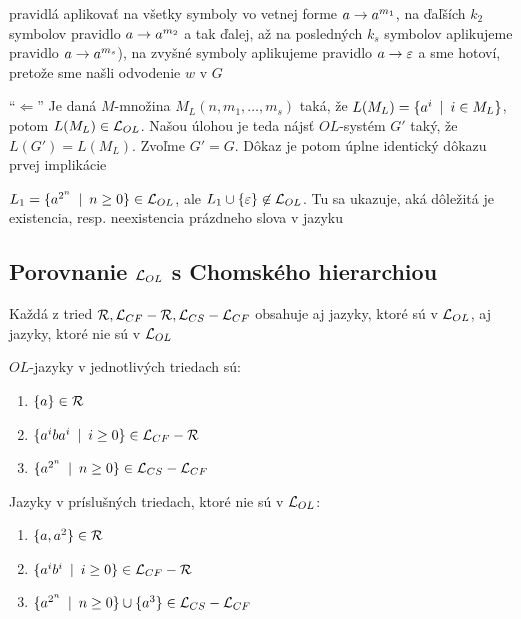 \begin{dokaz}
\begin{description}
\begin{description}
{          pravidlá aplikovať na všetky symboly vo vetnej forme} $a\rightarrow
          a^{m_{1}}$, na ďaľších $k_{2}$ symbolov pravidlo $a\rightarrow a^{m_{2}}$
          a tak ďalej, až na posledných $k_{s}$ symbolov aplikujeme pravidlo
          $a\rightarrow a^{m_{s}}$), na zvyšné symboly aplikujeme pravidlo
          $a\rightarrow\varepsilon$ a sme hotoví, pretože sme našli odvodenie $w$ v
          $G$
      \end{description}
    \item{``$\Leftarrow$''} Je daná $M$-množina
      $M_{L}(n,m_{1},\dots,m_{s})$ taká, že $L(M_{L})=\{a^{i}\enspace |\enspace i\in
      M_{L}\}$, potom $L(M_{L})\in\mathcal{L}_{OL}$. Našou úlohou je
      teda nájsť $OL$-systém $G'$ taký, že $L(G')=L(M_{L})$. Zvoľme
      $G'=G$. Dôkaz je potom úplne identický dôkazu prvej implikácie
  \end{description}
\end{dokaz}

\begin{poznamka}
  $L_{1}=\{a^{2^{n}}\enspace |\enspace n\geq0\}\in\mathcal{L}_{OL}$, ale
  $L_{1}\cup\{\varepsilon\}\not\in\mathcal{L}_{OL}$. Tu sa ukazuje,
  aká dôležitá je existencia, resp. neexistencia prázdneho slova v
  jazyku
\end{poznamka}

\subsection{Porovnanie $\mathcal{L}_{OL}$ s Chomského hierarchiou}

\begin{veta}
  Každá z tried $\mathcal{R},\mathcal{L}_{CF} - \mathcal{R},
  \mathcal{L}_{CS} - \mathcal{L}_{CF}$ obsahuje aj jazyky, ktoré sú
  v $\mathcal{L}_{OL}$, aj jazyky, ktoré nie sú v $\mathcal{L}_{OL}$
\end{veta}

\begin{dokaz}
  $OL$-jazyky v jednotlivých triedach sú:

  \begin{enumerate}
    \item $\{a\}\in\mathcal{R}$
    \item $\{a^{i}ba^{i}\enspace |\enspace i\geq0\}\in\mathcal{L}_{CF} - \mathcal{R}$
    \item $\{a^{2^{n}}\enspace |\enspace n\geq0\}\in\mathcal{L}_{CS} - \mathcal{L}_{CF}$
  \end{enumerate}

  Jazyky v príslušných triedach, ktoré nie sú v $\mathcal{L}_{OL}$:

  \begin{enumerate}
    \item $\{a,a^{2}\}\in\mathcal{R}$
    \item $\{a^{i}b^{i}\enspace |\enspace i\geq0\}\in\mathcal{L}_{CF} - \mathcal{R}$
    \item $\{a^{2^{n}}\enspace |\enspace n\geq0\}\cup\{a^{3}\}\in\mathcal{L}_{CS}
      - \mathcal{L}_{CF}$
  \end{enumerate}
\end{dokaz}

